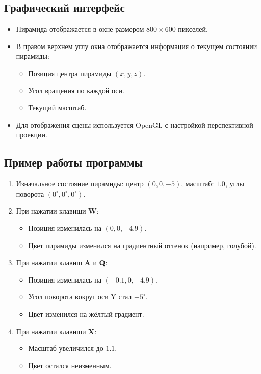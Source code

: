 \subsection*{Графический интерфейс}
\begin{itemize}
    \item Пирамида отображается в окне размером $800 \times 600$ пикселей.
    \item В правом верхнем углу окна отображается информация о текущем состоянии пирамиды:
    \begin{itemize}
        \item Позиция центра пирамиды $(x, y, z)$.
        \item Угол вращения по каждой оси.
        \item Текущий масштаб.
    \end{itemize}
    \item Для отображения сцены используется OpenGL с настройкой перспективной проекции.
\end{itemize}

\subsection*{Пример работы программы}
\begin{enumerate}
    \item Изначальное состояние пирамиды: центр $(0, 0, -5)$, масштаб: $1.0$, углы поворота $(0^\circ, 0^\circ, 0^\circ)$.
    \item При нажатии клавиши \textbf{W}:
    \begin{itemize}
        \item Позиция изменилась на $(0, 0, -4.9)$.
        \item Цвет пирамиды изменился на градиентный оттенок (например, голубой).
    \end{itemize}
    \item При нажатии клавиш \textbf{A} и \textbf{Q}:
    \begin{itemize}
        \item Позиция изменилась на $(-0.1, 0, -4.9)$.
        \item Угол поворота вокруг оси Y стал $-5^\circ$.
        \item Цвет изменился на жёлтый градиент.
    \end{itemize}
    \item При нажатии клавиши \textbf{X}:
    \begin{itemize}
        \item Масштаб увеличился до $1.1$.
        \item Цвет остался неизменным.
    \end{itemize}
\end{enumerate}

